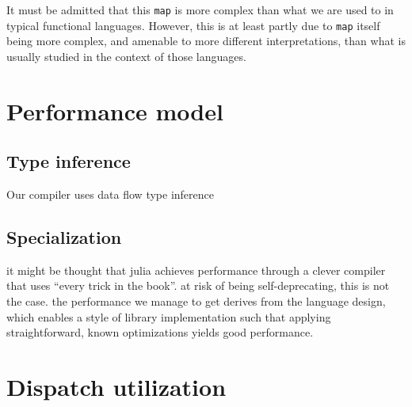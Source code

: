 It must be admitted that this \texttt{map} is more complex than
what we are used to in typical functional languages.
However, this is at least partly due to \texttt{map} itself
being more complex, and amenable to more different interpretations,
than what is usually studied in the context of those languages.


\section{Performance model}

\subsection{Type inference}

Our compiler uses data flow type inference

\cite{kaplanullman,abstractinterp,graphfree}

\subsection{Specialization}

it might be thought that julia achieves performance through a clever
compiler that uses ``every trick in the book''.
at risk of being self-deprecating, this is not the case.
the performance we manage to get derives from the language design,
which enables a style of library implementation such that applying straightforward,
known optimizations yields good performance.

\cite{Dragos:2009:CGT:1565824.1565830}


\section{Dispatch utilization}

